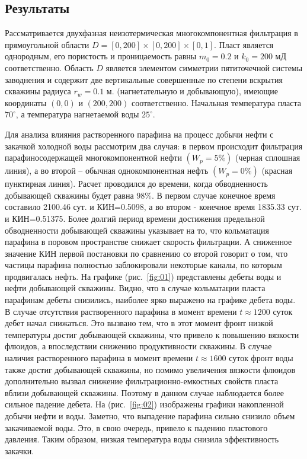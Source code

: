 \documentclass[a4paper,12pt]{article}
\begin{document}
\vspace{1em}
{\subsection*{\normalsize Результаты}}
	Рассматривается двухфазная неизотермическая многокомпонентная фильтрация в прямоугольной области $D = [0, 200] \times [0, 200] \times [0, 1]$. Пласт является однородным, его пористость и проницаемость равны $m_0=0.2$  и $k_0=200$ мД соответственно. Область $D$ является элементом симметрии пятиточечной системы заводнения и содержит две вертикальные совершенные по степени вскрытия скважины радиуса $r_w = 0.1$ м. (нагнетательную и добывающую), имеющие координаты $(0,0)$ и $(200,200)$ соответственно. Начальная температура пласта $70^{\circ}$, а температура нагнетаемой воды $25^{\circ}$.
	\par Для анализа влияния растворенного парафина на процесс добычи нефти с закачкой холодной воды рассмотрим два случая: в первом происходит фильтрация парафиносодержащей многокомпонентной нефти $(W_p=5 \%)$ (черная сплошная линия), а во второй – обычная однокомпонентная нефть $(W_p=0 \%)$ (красная пунктирная линия). Расчет проводился до времени, когда обводненность добывающей скважины будет равна $98 \%$. В первом случае конечное время составило 2100.46 сут. и КИН=0.5098, а во втором - конечное время 1835.33 сут. и КИН=0.51375. Более долгий период времени достижения предельной обводненности добывающей скважины указывает на то, что кольматация парафина в поровом пространстве снижает скорость фильтрации. А сниженное значение КИН первой постановки по сравнению со второй говорит о том, что частицы парафина полностью заблокировали некоторые каналы, по которым продвигалась нефть. На графике (рис.~\ref{fig:01}) представлены дебеты воды и нефти добывающей скважины. Видно, что в случае кольматации пласта парафинам дебеты снизились, наиболее ярко выражено на графике дебета воды. В случае отсутствия растворенного парафина в момент времени $t\approx 1200$ суток дебет начал снижаться. Это вызвано тем, что в этот момент фронт низкой температуры достиг добывающей скважины, что привело к повышению вязкости флюидов, а впоследствии снижению продуктивности скважины. В случае наличия растворенного парафина в момент времени $t\approx 1600$ суток фронт воды также достиг добывающей скважины, но помимо увеличения вязкости флюидов дополнительно вызвал снижение фильтрационно-емкостных свойств пласта вблизи добывающей скважины. Поэтому в данном случае наблюдается более сильное падение дебета. На (рис.~\ref{fig:02}) изображены графики накопленной добычи нефти и воды. Заметно, что выпадение парафина сильно снизило объем закачиваемой воды. Это, в свою очередь, привело к падению пластового давления. Таким образом, низкая температура воды снизила эффективность закачки.
\end{document}

